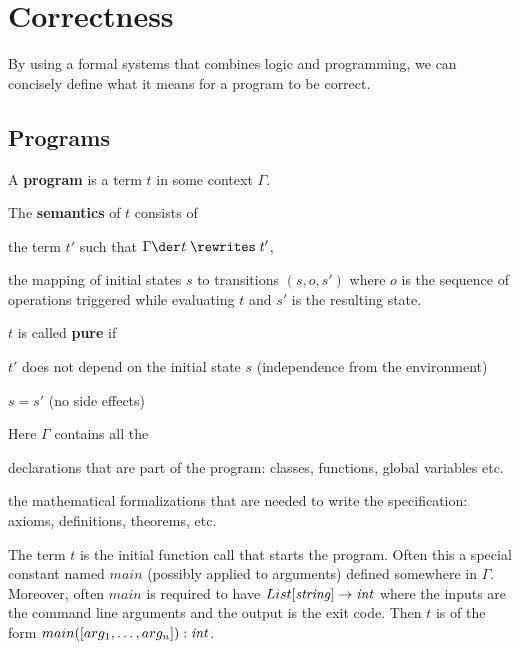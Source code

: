 \section{Correctness}

By using a formal systems that combines logic and programming, we can concisely define what it means for a program to be correct.

\subsection{Programs}

\begin{definition}
A \textbf{program} is a term $t$ in some context $\Gamma$.

The \textbf{semantics} of $t$ consists of
\begin{compactitem}
 \item the term $t'$ such that $\evobj{}{\Gamma}{t}{t'}$,
 \item the mapping of initial states $s$ to transitions $(s,o,s')$ where $o$ is the sequence of operations triggered while evaluating $t$ and $s'$ is the resulting state.
\end{compactitem}

$t$ is called \textbf{pure} if
\begin{compactitem}
 \item $t'$ does not depend on the initial state $s$ (independence from the environment)
 \item $s=s'$ (no side effects)
\end{compactitem}
\end{definition}

Here $\Gamma$ contains all the
\begin{compactitem}
 \item declarations that are part of the program: classes, functions, global variables etc.
 \item the mathematical formalizations that are needed to write the specification: axioms, definitions, theorems, etc.
\end{compactitem}

The term $t$ is the initial function call that starts the program.
Often this a special constant named $main$ (possibly applied to arguments) defined somewhere in $\Gamma$.
Moreover, often $main$ is required to have $List[\mathit{string}]\to \mathit{int}$ where the inputs are the command line arguments and the output is the exit code.
Then $t$ is of the form $main([arg_1,\ldots,arg_n]):\mathit{int}$.


